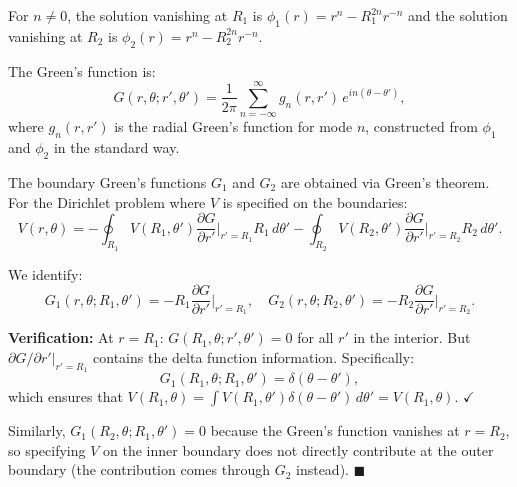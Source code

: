 \documentclass[12pt]{article}
\begin{document}
For $n \neq 0$, the solution vanishing at $R_1$ is $\phi_1(r) = r^n - R_1^{2n}r^{-n}$ and the solution vanishing at $R_2$ is $\phi_2(r) = r^n - R_2^{2n}r^{-n}$.

The Green's function is:
\[
G(r,\theta;r',\theta') = \frac{1}{2\pi}\sum_{n=-\infty}^{\infty}g_n(r,r')\,e^{in(\theta-\theta')},
\]
where $g_n(r,r')$ is the radial Green's function for mode $n$, constructed from $\phi_1$ and $\phi_2$ in the standard way.

The boundary Green's functions $G_1$ and $G_2$ are obtained via Green's theorem. For the Dirichlet problem where $V$ is specified on the boundaries:
\[
V(r,\theta) = -\oint_{R_1} V(R_1,\theta')\frac{\partial G}{\partial r'}\bigg|_{r'=R_1}R_1\,d\theta' - \oint_{R_2}V(R_2,\theta')\frac{\partial G}{\partial r'}\bigg|_{r'=R_2}R_2\,d\theta'.
\]

We identify:
\[
G_1(r,\theta;R_1,\theta') = -R_1\frac{\partial G}{\partial r'}\bigg|_{r'=R_1}, \quad G_2(r,\theta;R_2,\theta') = -R_2\frac{\partial G}{\partial r'}\bigg|_{r'=R_2}.
\]

\textbf{Verification:} At $r = R_1$: $G(R_1,\theta;r',\theta') = 0$ for all $r'$ in the interior. But $\partial G/\partial r'|_{r'=R_1}$ contains the delta function information. Specifically:
\[
G_1(R_1,\theta;R_1,\theta') = \delta(\theta - \theta'),
\]
which ensures that $V(R_1,\theta) = \int V(R_1,\theta')\delta(\theta-\theta')\,d\theta' = V(R_1,\theta)$. $\checkmark$

Similarly, $G_1(R_2,\theta;R_1,\theta') = 0$ because the Green's function vanishes at $r = R_2$, so specifying $V$ on the inner boundary does not directly contribute at the outer boundary (the contribution comes through $G_2$ instead). $\blacksquare$
\end{document}
